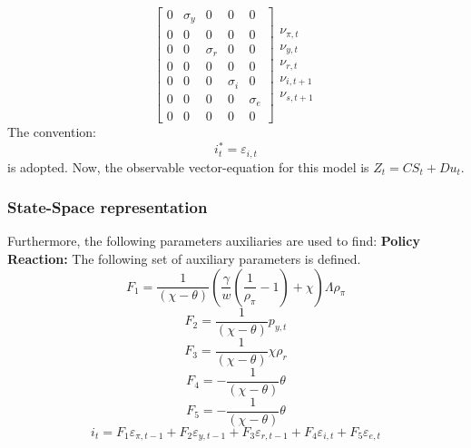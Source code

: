 \documentclass{beamer}
\begin{document}
\begin{frame}
{\begin{equation}
\begin{bmatrix}
0 & \sigma_y & 0 & 0 & 0 \\
0 & 0 & 0 & 0 & 0 \\
0 & 0 & \sigma_r & 0 & 0 \\
0 & 0 & 0 & 0 & 0 \\
0 & 0 & 0 & \sigma_i & 0 \\
0 & 0 & 0 & 0 & \sigma_e \\
0 & 0 & 0 & 0 & 0 
\end{bmatrix}
\begin{matrix}
\nu_{\pi,t} \\
\nu_{y,t} \\
\nu_{r,t} \\
\nu_{i,t+1} \\
\nu_{s,t+1} 
\end{matrix}
\end{equation}
}
The convention:
\begin{equation}
i^*_t = \varepsilon_{i,t}
\end{equation}
is adopted. Now, the observable vector-equation for this model is $Z_t = C S_t + D
u_t$.
\end{frame}

\begin{frame} 
 \frametitle{State-Space representation} 
Furthermore, the following parameters auxiliaries are used to find:
\newline
\newline
\textbf{Policy Reaction:} The following set of auxiliary parameters is defined.
\begin{equation}
F_1 = \frac{1}{(\chi-\theta)} \left (\frac{\gamma}{w} (\frac{1}{\rho_\pi} - 1) + \chi \right ) \Lambda \rho_\pi
\end{equation}
\begin{equation}
F_2 = \frac{1}{(\chi-\theta)} p_{y,t}
\end{equation}
\begin{equation}
F_3 = \frac{1}{(\chi-\theta)} \chi \rho_r
\end{equation}
\begin{equation}
F_4 = -\frac{1}{(\chi-\theta)} \theta
\end{equation}
\begin{equation}
F_5 = -\frac{1}{(\chi-\theta)} \theta
\end{equation}
\begin{equation}
i_t = F_1 \varepsilon_{\pi,t-1} + F_2 \varepsilon_{y,t-1} + F_3 \varepsilon_{r,t-1} + F_4 \varepsilon_{i,t} + F_5 \varepsilon_{e,t}
\end{equation}
\end{frame}
\end{document}
